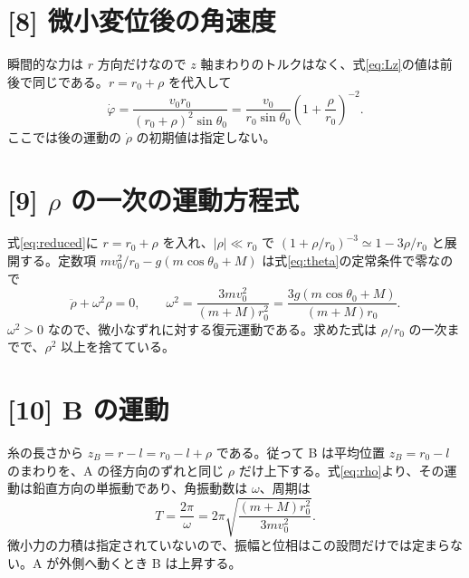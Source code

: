 \documentclass[11pt,a4paper]{article}
\begin{document}
\section*{[8] 微小変位後の角速度}
瞬間的な力は $r$ 方向だけなので $z$ 軸まわりのトルクはなく、式\eqref{eq:Lz}の値は前後で同じである。$r=r_0+\rho$ を代入して
\begin{equation}
 \boxed{\dot\varphi=\frac{v_0r_0}{(r_0+\rho)^2\sin\theta_0}
 =\frac{v_0}{r_0\sin\theta_0}\left(1+\frac{\rho}{r_0}\right)^{-2}.} \label{eq:phirho}
\end{equation}
ここでは後の運動の $\dot\rho$ の初期値は指定しない。

\section*{[9] $\rho$ の一次の運動方程式}
式\eqref{eq:reduced}に $r=r_0+\rho$ を入れ、$|\rho|\ll r_0$ で $(1+\rho/r_0)^{-3}\simeq1-3\rho/r_0$ と展開する。定数項 $mv_0^2/r_0-g(m\cos\theta_0+M)$ は式\eqref{eq:theta}の定常条件で零なので
\begin{equation}
 \boxed{\ddot\rho+\omega^2\rho=0,\qquad
 \omega^2=\frac{3m v_0^2}{(m+M)r_0^2}
 =\frac{3g(m\cos\theta_0+M)}{(m+M)r_0}.} \label{eq:rho}
\end{equation}
$\omega^2>0$ なので、微小なずれに対する復元運動である。求めた式は $\rho/r_0$ の一次までで、$\rho^2$ 以上を捨てている。

\section*{[10] B の運動}
糸の長さから $z_B=r-l=r_0-l+\rho$ である。従って B は平均位置 $z_B=r_0-l$ のまわりを、A の径方向のずれと同じ $\rho$ だけ上下する。式\eqref{eq:rho}より、その運動は鉛直方向の単振動であり、角振動数は $\omega$、周期は
\[
 \boxed{T=\frac{2\pi}{\omega}
 =2\pi\sqrt{\frac{(m+M)r_0^2}{3m v_0^2}}.}
\]
微小力の力積は指定されていないので、振幅と位相はこの設問だけでは定まらない。A が外側へ動くとき B は上昇する。
\end{document}

